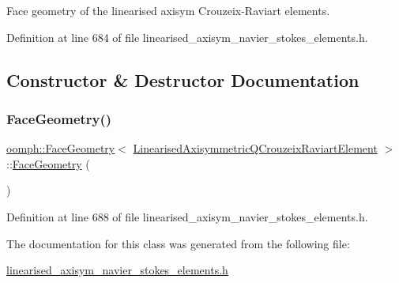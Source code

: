 Face geometry of the linearised axisym Crouzeix-\/\+Raviart elements. 

Definition at line 684 of file linearised\+\_\+axisym\+\_\+navier\+\_\+stokes\+\_\+elements.\+h.



\subsection{Constructor \& Destructor Documentation}
\mbox{\label{classoomph_1_1FaceGeometry_3_01LinearisedAxisymmetricQCrouzeixRaviartElement_01_4_a9b08bbd8da6f675ce64bb41d3a78a15a}} 
\subsubsection{\texorpdfstring{Face\+Geometry()}{FaceGeometry()}}
{\footnotesize\ttfamily \hyperlink{classoomph_1_1FaceGeometry}{oomph\+::\+Face\+Geometry}$<$ \hyperlink{classoomph_1_1LinearisedAxisymmetricQCrouzeixRaviartElement}{Linearised\+Axisymmetric\+Q\+Crouzeix\+Raviart\+Element} $>$\+::\hyperlink{classoomph_1_1FaceGeometry}{Face\+Geometry} (\begin{DoxyParamCaption}{ }\end{DoxyParamCaption})\hspace{0.3cm}{\ttfamily [inline]}}



Definition at line 688 of file linearised\+\_\+axisym\+\_\+navier\+\_\+stokes\+\_\+elements.\+h.



The documentation for this class was generated from the following file\+:\begin{DoxyCompactItemize}
\item 
\hyperlink{linearised__axisym__navier__stokes__elements_8h}{linearised\+\_\+axisym\+\_\+navier\+\_\+stokes\+\_\+elements.\+h}\end{DoxyCompactItemize}
